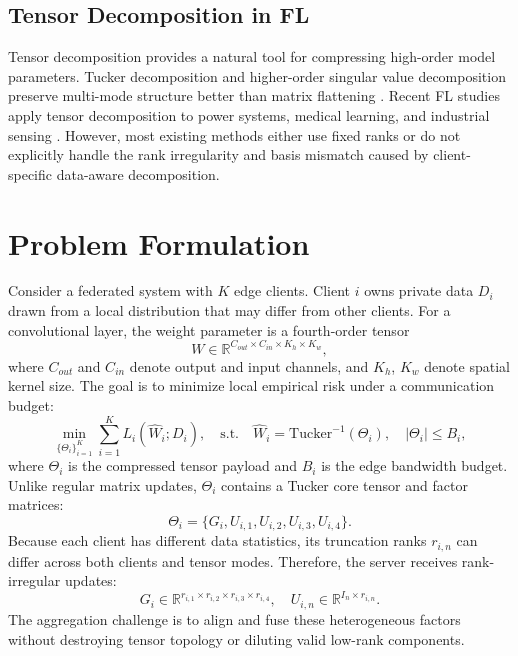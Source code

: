\documentclass[conference]{IEEEtran}
\begin{document}
\subsection{Tensor Decomposition in FL}
Tensor decomposition provides a natural tool for compressing high-order model parameters. Tucker decomposition and higher-order singular value decomposition preserve multi-mode structure better than matrix flattening \cite{kolda2009tensor}. Recent FL studies apply tensor decomposition to power systems, medical learning, and industrial sensing \cite{zhang2026multi,wang2025knowledge,han2026tdpfed}. However, most existing methods either use fixed ranks or do not explicitly handle the rank irregularity and basis mismatch caused by client-specific data-aware decomposition.

\section{Problem Formulation}
Consider a federated system with $K$ edge clients. Client $i$ owns private data $D_i$ drawn from a local distribution that may differ from other clients. For a convolutional layer, the weight parameter is a fourth-order tensor
\begin{equation}
    W \in \mathbb{R}^{C_{out} \times C_{in} \times K_h \times K_w},
\end{equation}
where $C_{out}$ and $C_{in}$ denote output and input channels, and $K_h$, $K_w$ denote spatial kernel size.
The goal is to minimize local empirical risk under a communication budget:
\begin{equation}
    \min_{\{\Theta_i\}_{i=1}^{K}} \sum_{i=1}^{K} L_i(\hat{W}_i;D_i),
    \quad
    \text{s.t.}
    \quad
    \hat{W}_i=\mathrm{Tucker}^{-1}(\Theta_i),
    \quad
    |\Theta_i|\leq B_i,
    \label{eq:problem}
\end{equation}
where $\Theta_i$ is the compressed tensor payload and $B_i$ is the edge bandwidth budget.
Unlike regular matrix updates, $\Theta_i$ contains a Tucker core tensor and factor matrices:
\begin{equation}
    \Theta_i = \{G_i,U_{i,1},U_{i,2},U_{i,3},U_{i,4}\}.
\end{equation}
Because each client has different data statistics, its truncation ranks
$r_{i,n}$ can differ across both clients and tensor modes. Therefore, the server receives rank-irregular updates:
\begin{equation}
    G_i \in \mathbb{R}^{r_{i,1}\times r_{i,2}\times r_{i,3}\times r_{i,4}},
    \quad
    U_{i,n}\in \mathbb{R}^{I_n\times r_{i,n}}.
\end{equation}
The aggregation challenge is to align and fuse these heterogeneous factors without destroying tensor topology or diluting valid low-rank components.
\end{document}
